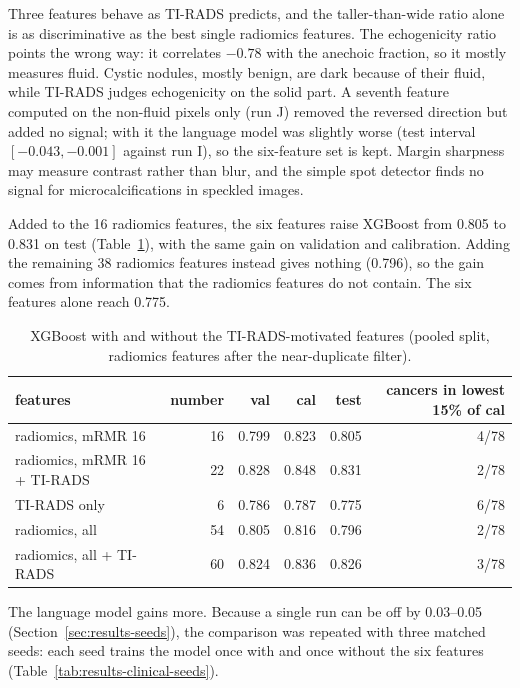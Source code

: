 Three features behave as TI-RADS predicts, and the taller-than-wide ratio alone is as
discriminative as the best single radiomics features. The echogenicity ratio points the wrong way:
it correlates $-0.78$ with the anechoic fraction, so it mostly measures fluid. Cystic nodules,
mostly benign, are dark because of their fluid, while TI-RADS judges echogenicity on the solid
part. A seventh feature computed on the non-fluid pixels only (run J) removed the reversed
direction but added no signal; with it the language model was slightly worse (test interval
$[-0.043, -0.001]$ against run I), so the six-feature set is kept. Margin sharpness may measure
contrast rather than blur, and the simple spot detector finds no signal for microcalcifications in
speckled images.

Added to the 16 radiomics features, the six features raise XGBoost from 0.805 to 0.831 on test
(Table~\ref{tab:results-clinical-xgb}), with the same gain on validation and calibration. Adding the
remaining 38 radiomics features instead gives nothing (0.796), so the gain comes from information
that the radiomics features do not contain. The six features alone reach 0.775.

\begin{table}[ht]
  \centering
  \small
  \caption{XGBoost with and without the TI-RADS-motivated features (pooled split, radiomics
           features after the near-duplicate filter).}
  \label{tab:results-clinical-xgb}
  \begin{tabular}{lrrrrr}
    \toprule
    features & number & val & cal & test & \multicolumn{1}{p{2.4cm}}{\raggedleft cancers in lowest 15\% of cal} \\
    \midrule
    radiomics, mRMR 16            & 16 & 0.799 & 0.823 & 0.805 & 4/78 \\
    radiomics, mRMR 16 + TI-RADS  & 22 & 0.828 & 0.848 & 0.831 & 2/78 \\
    TI-RADS only                  &  6 & 0.786 & 0.787 & 0.775 & 6/78 \\
    radiomics, all                & 54 & 0.805 & 0.816 & 0.796 & 2/78 \\
    radiomics, all + TI-RADS      & 60 & 0.824 & 0.836 & 0.826 & 3/78 \\
    \bottomrule
  \end{tabular}
\end{table}

The language model gains more. Because a single run can be off by 0.03--0.05
(Section~\ref{sec:results-seeds}), the comparison was repeated with three matched seeds: each seed
trains the model once with and once without the six features
(Table~\ref{tab:results-clinical-seeds}).

